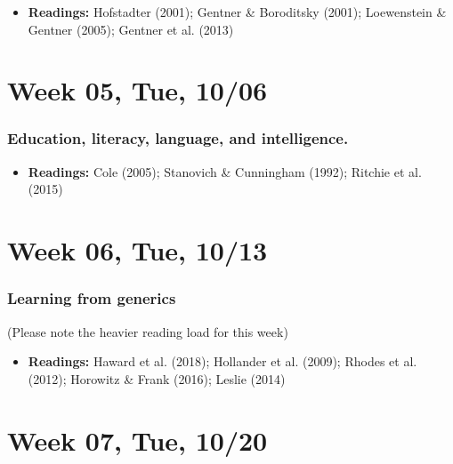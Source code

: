 \documentclass[11pt,man]{article}
\providecommand{\tightlist}{%
  \setlength{\itemsep}{0pt}\setlength{\parskip}{0pt}}
\begin{document}
\begin{itemize}
\tightlist
\item
  \textbf{Readings:} Hofstadter (2001); Gentner \& Boroditsky (2001);
  Loewenstein \& Gentner (2005); Gentner et al. (2013)
\end{itemize}

\hypertarget{week-05-tue-1006}{%
\section{Week 05, Tue, 10/06}\label{week-05-tue-1006}}

\hypertarget{education-literacy-language-and-intelligence.}{%
\subsubsection{Education, literacy, language, and
intelligence.}\label{education-literacy-language-and-intelligence.}}

\begin{itemize}
\tightlist
\item
  \textbf{Readings:} Cole (2005); Stanovich \& Cunningham (1992);
  Ritchie et al. (2015)
\end{itemize}

\hypertarget{week-06-tue-1013}{%
\section{Week 06, Tue, 10/13}\label{week-06-tue-1013}}

\hypertarget{learning-from-generics}{%
\subsubsection{Learning from generics}\label{learning-from-generics}}

(Please note the heavier reading load for this week)

\begin{itemize}
\tightlist
\item
  \textbf{Readings:} Haward et al. (2018); Hollander et al. (2009);
  Rhodes et al. (2012); Horowitz \& Frank (2016); Leslie (2014)
\end{itemize}

\hypertarget{week-07-tue-1020}{%
\section{Week 07, Tue, 10/20}\label{week-07-tue-1020}}
\end{document}

